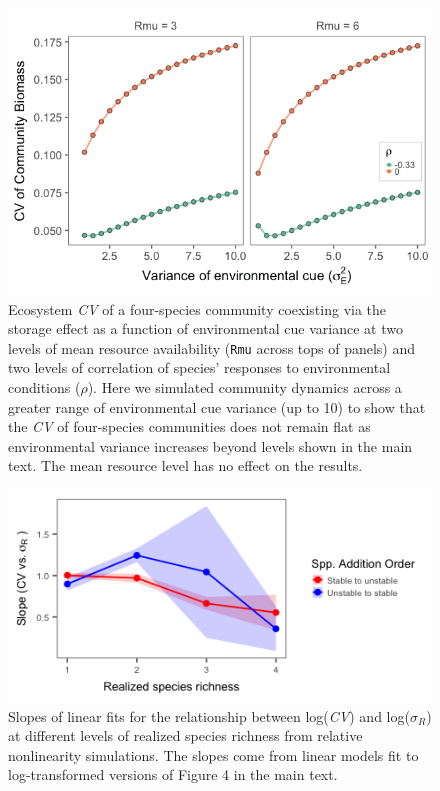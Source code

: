 \documentclass[11pt,]{article}
\begin{document}
\begin{figure}[!ht]
  \centering
      \includegraphics[width=5in]{./components/SI_storage_effect_two_rmus_fourSpeciesOnly.png}
  \caption{Ecosystem \emph{CV} of a four-species community coexisting via the storage effect as a function of environmental cue variance at two levels of mean resource availability (\texttt{Rmu} across tops of panels) and two levels of correlation of species' responses to environmental conditions ($\rho$). Here we simulated community dynamics across a greater range of environmental cue variance (up to 10) to show that the \emph{CV} of four-species communities does not remain flat as environmental variance increases beyond levels shown in the main text. The mean resource level has no effect on the results.}
\end{figure}

\newpage{}

\begin{figure}[!ht]
  \centering
      \includegraphics[width=5in]{./components/relative_nonlinearity_div+envar_loglog_slopes.png}
  \caption{Slopes of linear fits for the relationship between log(\emph{CV}) and log($\sigma_R$) at different levels of realized species richness from relative nonlinearity simulations. The slopes come from linear models fit to log-transformed versions of Figure 4 in the main text.}
\end{figure}
\end{document}

